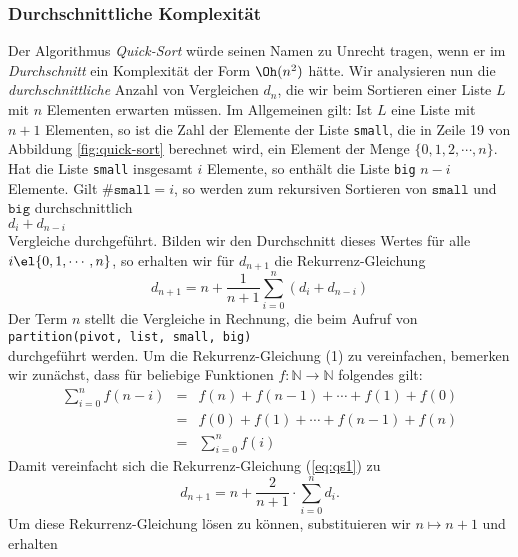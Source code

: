 \subsubsection{Durchschnittliche Komplexit\"at}
Der Algorithmus \emph{Quick-Sort} w\"urde seinen Namen zu Unrecht tragen, wenn er im
\emph{Durchschnitt} ein Komplexit\"at der Form $\Oh(n^2)$ h\"atte.  Wir analysieren nun die
\emph{durchschnittliche} Anzahl von Vergleichen $d_{n}$, die wir beim Sortieren einer
Liste $L$ mit $n$ Elementen erwarten m\"ussen.  Im Allgemeinen gilt: Ist $L$ eine Liste
mit $n+1$ Elementen, so ist die Zahl der Elemente der Liste \texttt{small}, die in Zeile 19
von Abbildung \ref{fig:quick-sort} berechnet wird, ein Element der Menge
$\{0,1,2,\cdots,n\}$.  Hat die Liste \texttt{small} insgesamt $i$ Elemente, so enth\"alt die
Liste \texttt{big} $n-i$ Elemente.  Gilt $\#\mathtt{small} = i$, so werden
zum rekursiven Sortieren von $\mathtt{small}$ und $\mathtt{big}$ durchschnittlich
\\[0.1cm]
\hspace*{1.3cm} $d_i + d_{n-i}$ \\[0.1cm]
Vergleiche durchgef\"uhrt.  Bilden wir den Durchschnitt dieses Wertes f\"ur alle $i \el
\{0,1,\cdots,n\}$, so erhalten wir
f\"ur $d_{n+1}$ die Rekurrenz-Gleichung 
\begin{equation}
  \label{eq:qs1}
  d_{n+1} = n + \frac{1}{n+1} \sum_{i=0}^n (d_i + d_{n-i})  
\end{equation}
Der Term $n$ stellt die Vergleiche in Rechnung, die beim Aufruf von 
\\[0.2cm]
\hspace*{1.3cm}
\texttt{partition(pivot, list, small, big)}
\\[0.2cm]
durchgef\"uhrt werden.  Um die Rekurrenz-Gleichung (1) zu vereinfachen, bemerken wir
zun\"achst, dass f\"ur beliebige Funktionen $f:\mathbb{N} \rightarrow \mathbb{N}$ folgendes gilt:
\begin{eqnarray}
\sum_{i=0}^n f(n-i) & = & f(n) + f(n-1) + \cdots + f(1) + f(0) \\
                    & = & f(0) + f(1) + \cdots + f(n-1) + f(n) \\
 \label{eq:qssum}
                    & = & \sum_{i=0}^n f(i) 
\end{eqnarray}
Damit vereinfacht sich die Rekurrenz-Gleichung (\ref{eq:qs1}) zu 
\begin{equation}
  \label{eq:qs2}
  d_{n+1} = n + \frac{2}{n+1} \cdot \sum_{i=0}^n d_i.   
\end{equation}
Um diese Rekurrenz-Gleichung l\"osen zu k\"onnen, substituieren wir $n \mapsto n+1$ und erhalten
